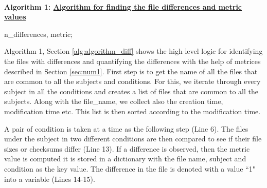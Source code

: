 \newpage
\textbf{\\Algorithm 1: \underline{Algorithm for finding the file differences and metric values}\label{alg:algorithm_diff}\\}
\DontPrintSemicolon
{}
{
\begin{algorithmic}[1]
\ENDFOR
\ENDFOR
{}
     
      
         
          \ENDIF
         
         
      \ENDFOR
  \ENDFOR
\ENDFOR
\end{algorithmic}
\KwRet n\_differences, metric;
}
\vskip 0.2in

Algorithm 1, Section \ref{alg:algorithm_diff} shows the high-level logic for identifying the files with differences and quantifying the differences with the help of metrices described in Section \ref{sec:num1}. First step is to get the name of all the files that are common to all the subjects and conditions. For this, we iterate through every subject in all the conditions and creates a list of files that are common to all the subjects. Along with the file\_name, we collect also the creation time, modification time etc. This list is then sorted according to the modification time. 

A pair of condition is taken at a time as the following step (Line 6). 
The files under the subject in two different conditions are then 
compared to see if their file sizes or checksums differ (Line 13). If a 
difference is observed, then the metric value is computed it is stored 
in a dictionary with the file name, subject and condition as the key 
value. The difference in the file is denoted with a value ``1" into a 
variable (Lines 14-15).

